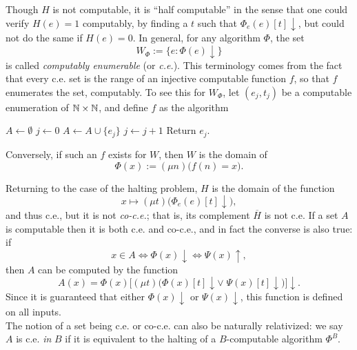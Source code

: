 \documentclass{amsart}
\begin{document}
	Though $H$ is not computable, it is ``half computable'' in the sense that one could verify $H(e)=1$ computably, by finding a $t$ such that $\Phi_e(e)[t]\downarrow$, but could not do the same if $H(e)=0$. In general, for any algorithm $\Phi$, the set
	$$
	W_{\Phi} := \{e : \Phi(e)\downarrow\}
	$$
	is called \textit{computably enumerable} (or \textit{c.e.}). This terminology comes from the fact that every c.e. set is the range of an injective computable function $f$, so that $f$ enumerates the set, computably. To see this for $W_{\Phi}$, let $(e_j,t_j)$ be a computable enumeration of $\mathbb{N}\times \mathbb{N}$, and define $f$ as the algorithm
	\begin{algorithmic}
		\State $A \gets \emptyset$
		\State $j\gets 0$
		\State $A\gets A\cup \{e_j\}$
		\EndIf
		\State $j\gets j+1$
		\EndWhile
		\State Return $e_j$.
	\end{algorithmic}
	Conversely, if such an $f$ exists for $W$, then $W$ is the domain of
	$$
	\Phi(x) := (\mu n)\big(f(n)=x\big).
	$$
	
	Returning to the case of the halting problem, $H$ is the domain of
	the function
	$$
	x\mapsto (\mu t)\big(\Phi_e(e)[t]\downarrow\big),
	$$
	and thus c.e., but it is not \textit{co-c.e.}; that is, its complement $\overline{H}$ is not c.e. If a set $A$ is computable then it is both c.e. and co-c.e., and in fact the converse is also true: if 
	$$
	x\in A \iff \Phi(x)\downarrow \iff \Psi(x)\uparrow,
	$$
	then $A$ can be computed by the 
	function
	$$
	A(x) = \Phi(x)\big[(\mu t)\big(\Phi(x)[t]\downarrow \vee \; \Psi(x)[t]\downarrow\big)\big]\downarrow .
	$$
	Since it is guaranteed that either $\Phi(x)\downarrow$ or $\Psi(x)\downarrow$, this function is defined on all inputs.\\ 
	
	The notion of a set being c.e. or co-c.e. can also be naturally relativized: we say $A$ is c.e. \textit{in} $B$ if it is equivalent to the halting of a $B$-computable algorithm $\Phi^B$.\\
	
\end{document}

